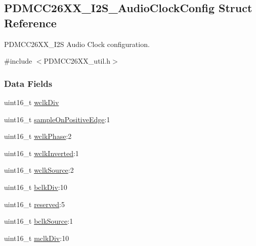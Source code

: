 \subsection{P\+D\+M\+C\+C26\+X\+X\+\_\+\+I2\+S\+\_\+\+Audio\+Clock\+Config Struct Reference}
\label{struct_p_d_m_c_c26_x_x___i2_s___audio_clock_config}


P\+D\+M\+C\+C26\+X\+X\+\_\+\+I2\+S Audio Clock configuration.  




{\ttfamily \#include $<$P\+D\+M\+C\+C26\+X\+X\+\_\+util.\+h$>$}

\subsubsection*{Data Fields}
\begin{DoxyCompactItemize}
\item 
uint16\+\_\+t \hyperlink{struct_p_d_m_c_c26_x_x___i2_s___audio_clock_config_ade00c43db3086dd3ecefb9fe7ccd3388}{wclk\+Div}
\item 
uint16\+\_\+t \hyperlink{struct_p_d_m_c_c26_x_x___i2_s___audio_clock_config_a2279f907affa09272498993fbeae89d0}{sample\+On\+Positive\+Edge}\+:1
\item 
uint16\+\_\+t \hyperlink{struct_p_d_m_c_c26_x_x___i2_s___audio_clock_config_a9331d100be715d25c802d26ce4c994ad}{wclk\+Phase}\+:2
\item 
uint16\+\_\+t \hyperlink{struct_p_d_m_c_c26_x_x___i2_s___audio_clock_config_a64a761c3713ca2df6e3f4e5a06b77e13}{wclk\+Inverted}\+:1
\item 
uint16\+\_\+t \hyperlink{struct_p_d_m_c_c26_x_x___i2_s___audio_clock_config_a4af2c2583820a348b3b6ec9061fd21c0}{wclk\+Source}\+:2
\item 
uint16\+\_\+t \hyperlink{struct_p_d_m_c_c26_x_x___i2_s___audio_clock_config_a5dd6e5158b7e1a285b271f255db2fc20}{bclk\+Div}\+:10
\item 
uint16\+\_\+t \hyperlink{struct_p_d_m_c_c26_x_x___i2_s___audio_clock_config_ad5468b30f2eea667d53831ee2a81ed1e}{reserved}\+:5
\item 
uint16\+\_\+t \hyperlink{struct_p_d_m_c_c26_x_x___i2_s___audio_clock_config_a393fa4b3cb3ce807911ff7b623e42bfd}{bclk\+Source}\+:1
\item 
uint16\+\_\+t \hyperlink{struct_p_d_m_c_c26_x_x___i2_s___audio_clock_config_a4c695f4c6e3933bacc7c1abab4eb379a}{mclk\+Div}\+:10
\end{DoxyCompactItemize}


